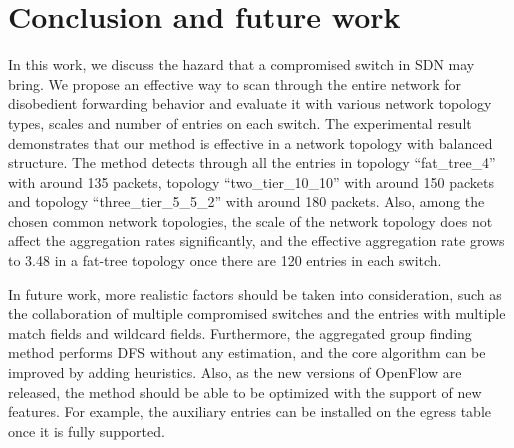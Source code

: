 \chapter{Conclusion and future work}
\label{conclusion}
In this work, we discuss the hazard that a compromised switch in SDN may bring. We propose an effective way to scan through the entire network for disobedient forwarding behavior and evaluate it with various network topology types, scales and number of entries on each switch. The experimental result demonstrates that our method is effective in a network topology with balanced structure. The method detects through all the entries in topology ``fat\_tree\_4'' with around 135 packets, topology ``two\_tier\_10\_10'' with around 150 packets and topology ``three\_tier\_5\_5\_2'' with around 180 packets. Also, among the chosen common network topologies, the scale of the network topology does not affect the aggregation rates significantly, and the effective aggregation rate grows to 3.48 in a fat-tree topology once there are 120 entries in each switch. 

In future work, more realistic factors should be taken into consideration, such as the collaboration of multiple compromised switches and the entries with multiple match fields and wildcard fields. Furthermore, the aggregated group finding method performs DFS without any estimation, and the core algorithm can be improved by adding heuristics. Also, as the new versions of OpenFlow are released, the method should be able to be optimized with the support of new features. For example, the auxiliary entries can be installed on the egress table once it is fully supported.